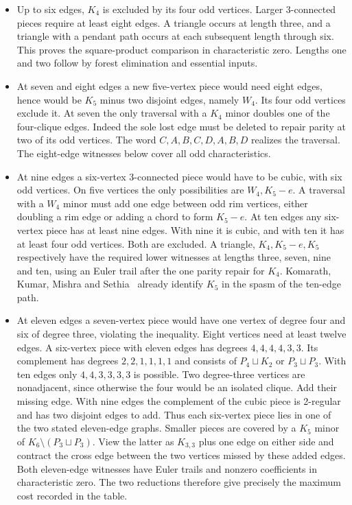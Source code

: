 \documentclass[11pt,letterpaper]{article}
\providecommand{\tightlist}{\setlength{\itemsep}{0pt}\setlength{\parskip}{0pt}}
\begin{document}
\begin{itemize}
\tightlist
\item
  Up to six edges, \(K_4\) is excluded by its four odd vertices. Larger 3-connected pieces require at least eight edges. A triangle occurs at length three, and a triangle with a pendant path occurs at each subsequent length through six. This proves the square-product comparison in characteristic zero. Lengths one and two follow by forest elimination and essential inputs.
\item
  At seven and eight edges a new five-vertex piece would need eight edges, hence would be \(K_5\) minus two disjoint edges, namely \(W_4\). Its four odd vertices exclude it. At seven the only traversal with a \(K_4\) minor doubles one of the four-clique edges. Indeed the sole lost edge must be deleted to repair parity at two of its odd vertices. The word \(C,A,B,C,D,A,B,D\) realizes the traversal. The eight-edge witnesses below cover all odd characteristics.
\item
  At nine edges a six-vertex 3-connected piece would have to be cubic, with six odd vertices. On five vertices the only possibilities are \(W_4,K_5-e\). A traversal with a \(W_4\) minor must add one edge between odd rim vertices, either doubling a rim edge or adding a chord to form \(K_5-e\). At ten edges any six-vertex piece has at least nine edges. With nine it is cubic, and with ten it has at least four odd vertices. Both are excluded. A triangle, \(K_4,K_5-e,K_5\) respectively have the required lower witnesses at lengths three, seven, nine and ten, using an Euler trail after the one parity repair for \(K_4\). Komarath, Kumar, Mishra and Sethia~\cite[Remark~46]{kkms-sparse-patterns} already identify \(K_5\) in the spasm of the ten-edge path.
\item
  At eleven edges a seven-vertex piece would have one vertex of degree four and six of degree three, violating the inequality. Eight vertices need at least twelve edges. A six-vertex piece with eleven edges has degrees \(4,4,4,4,3,3\). Its complement has degrees \(2,2,1,1,1,1\) and consists of \(P_4\sqcup K_2\) or \(P_3\sqcup P_3\). With ten edges only \(4,4,3,3,3,3\) is possible. Two degree-three vertices are nonadjacent, since otherwise the four would be an isolated clique. Add their missing edge. With nine edges the complement of the cubic piece is 2-regular and has two disjoint edges to add. Thus each six-vertex piece lies in one of the two stated eleven-edge graphs. Smaller pieces are covered by a \(K_5\) minor of \(K_6\setminus(P_3\sqcup P_3)\). View the latter as \(K_{3,3}\) plus one edge on either side and contract the cross edge between the two vertices missed by these added edges. Both eleven-edge witnesses have Euler trails and nonzero coefficients in characteristic zero. The two reductions therefore give precisely the maximum cost recorded in the table.
\end{itemize}
\end{document}
